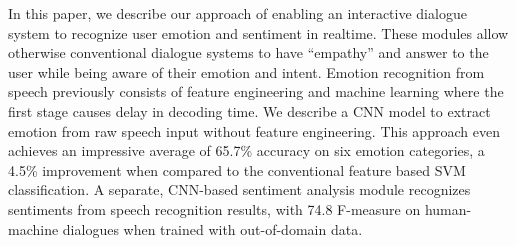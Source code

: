 In this paper, we describe our approach of enabling an interactive dialogue system to recognize user emotion and sentiment in realtime. These modules allow otherwise conventional dialogue systems to have ``empathy'' and answer to the user while being aware of their emotion and intent. Emotion recognition from speech previously consists of feature engineering and machine learning where the first stage causes delay in decoding time. We describe a CNN model to extract emotion from raw speech input without feature engineering. This approach even achieves an impressive average of 65.7\% accuracy on six emotion categories, a 4.5\% improvement when compared to the conventional feature based SVM classification. A separate, CNN-based sentiment analysis module recognizes sentiments from speech recognition results, with 74.8 F-measure on human-machine dialogues when trained with out-of-domain data.
